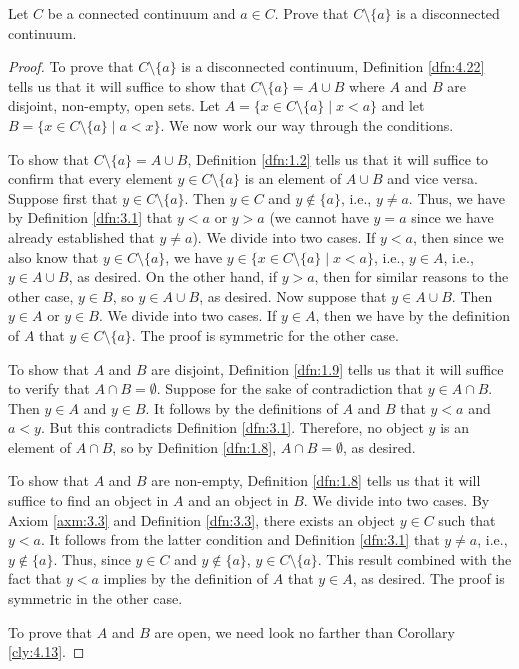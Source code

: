 \documentclass[../main.tex]{subfiles}
\begin{document}
\begin{exercise}\label{exr:4.23}
    Let $C$ be a connected continuum and $a\in C$. Prove that $C\setminus\{a\}$ is a disconnected continuum.
    \begin{proof}
        To prove that $C\setminus\{a\}$ is a disconnected continuum, Definition \ref{dfn:4.22} tells us that it will suffice to show that $C\setminus\{a\}=A\cup B$ where $A$ and $B$ are disjoint, non-empty, open sets. Let $A=\{x\in C\setminus\{a\}\mid x<a\}$ and let $B=\{x\in C\setminus\{a\}\mid a<x\}$. We now work our way through the conditions.\par
        To show that $C\setminus\{a\}=A\cup B$, Definition \ref{dfn:1.2} tells us that it will suffice to confirm that every element $y\in C\setminus\{a\}$ is an element of $A\cup B$ and vice versa. Suppose first that $y\in C\setminus\{a\}$. Then $y\in C$ and $y\notin\{a\}$, i.e., $y\neq a$. Thus, we have by Definition \ref{dfn:3.1} that $y<a$ or $y>a$ (we cannot have $y=a$ since we have already established that $y\neq a$). We divide into two cases. If $y<a$, then since we also know that $y\in C\setminus\{a\}$, we have $y\in\{x\in C\setminus\{a\}\mid x<a\}$, i.e., $y\in A$, i.e., $y\in A\cup B$, as desired. On the other hand, if $y>a$, then for similar reasons to the other case, $y\in B$, so $y\in A\cup B$, as desired. Now suppose that $y\in A\cup B$. Then $y\in A$ or $y\in B$. We divide into two cases. If $y\in A$, then we have by the definition of $A$ that $y\in C\setminus\{a\}$. The proof is symmetric for the other case.\par
        To show that $A$ and $B$ are disjoint, Definition \ref{dfn:1.9} tells us that it will suffice to verify that $A\cap B=\emptyset$. Suppose for the sake of contradiction that $y\in A\cap B$. Then $y\in A$ and $y\in B$. It follows by the definitions of $A$ and $B$ that $y<a$ and $a<y$. But this contradicts Definition \ref{dfn:3.1}. Therefore, no object $y$ is an element of $A\cap B$, so by Definition \ref{dfn:1.8}, $A\cap B=\emptyset$, as desired.\par
        To show that $A$ and $B$ are non-empty, Definition \ref{dfn:1.8} tells us that it will suffice to find an object in $A$ and an object in $B$. We divide into two cases. By Axiom \ref{axm:3.3} and Definition \ref{dfn:3.3}, there exists an object $y\in C$ such that $y<a$. It follows from the latter condition and Definition \ref{dfn:3.1} that $y\neq a$, i.e., $y\notin\{a\}$. Thus, since $y\in C$ and $y\notin\{a\}$, $y\in C\setminus\{a\}$. This result combined with the fact that $y<a$ implies by the definition of $A$ that $y\in A$, as desired. The proof is symmetric in the other case.\par
        To prove that $A$ and $B$ are open, we need look no farther than Corollary \ref{cly:4.13}.
    \end{proof}
\end{exercise}
\end{document}
